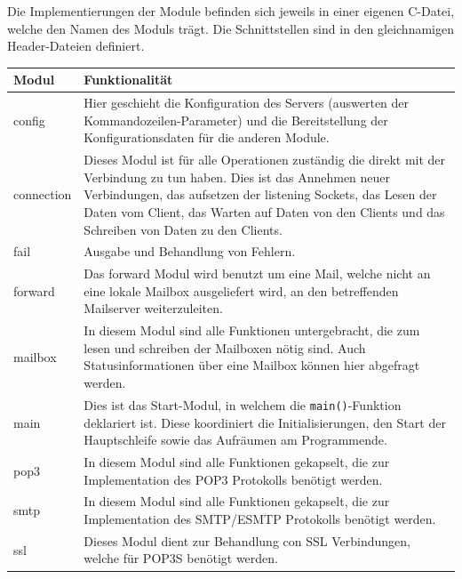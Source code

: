 \documentclass[final,a4paper,11pt,notitlepage,halfparskip]{scrreprt}
\begin{document}
Die Implementierungen der Module befinden sich jeweils in einer eigenen C-Datei,
welche den Namen des Moduls trägt. Die Schnittstellen sind in den gleichnamigen
Header-Dateien definiert.

\vspace{3mm}

\begin{tabular}[h]{lp{30em}}
  Modul       & Funktionalität \\
  \hline\hline
  config      & Hier geschieht die Konfiguration des Servers (auswerten der
                Kommandozeilen-Parameter) und die Bereitstellung der 
		Konfigurationsdaten für die anderen Module.\\
  connection  & Dieses Modul ist für alle Operationen zuständig die direkt mit
                der Verbindung zu tun haben. Dies ist das Annehmen neuer
		Verbindungen, das aufsetzen der listening Sockets, das Lesen der
		Daten vom Client, das Warten auf Daten von den Clients und das
		Schreiben von Daten zu den Clients.\\
  fail        & Ausgabe und Behandlung von Fehlern.\\
  forward     & Das forward Modul wird benutzt um eine Mail, welche nicht an
                eine lokale Mailbox ausgeliefert wird, an den betreffenden
		Mailserver weiterzuleiten.\\
  mailbox     & In diesem Modul sind alle Funktionen untergebracht, die zum
                lesen und schreiben der Mailboxen nötig sind. Auch
		Statusinformationen über eine Mailbox können hier abgefragt
		werden.\\
  main        & Dies ist das Start-Modul, in welchem die 
                \texttt{main()}-Funktion deklariert ist. Diese koordiniert die
		Initialisierungen, den Start der Hauptschleife sowie das
		Aufräumen am Programmende.\\
  pop3        & In diesem Modul sind alle Funktionen gekapselt, die zur
                Implementation des POP3 Protokolls benötigt werden.\\
  smtp        & In diesem Modul sind alle Funktionen gekapselt, die zur
                Implementation des SMTP/ESMTP Protokolls benötigt werden.\\
  ssl         & Dieses Modul dient zur Behandlung con SSL Verbindungen, welche
                für POP3S benötigt werden.\\
  \hline
\end{tabular}
\vspace{3mm}
\end{document}
